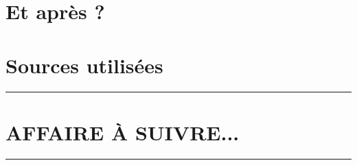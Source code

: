 \documentclass[12pt]{amsart}
\newcommand\contentdir{\jobname}
\begin{document}
\section{Et après ?}






\section{Sources utilisées} \label{sources}






\newpage

\hrule

\section{AFFAIRE À SUIVRE...}

\bigskip

\hrule
\end{document}
